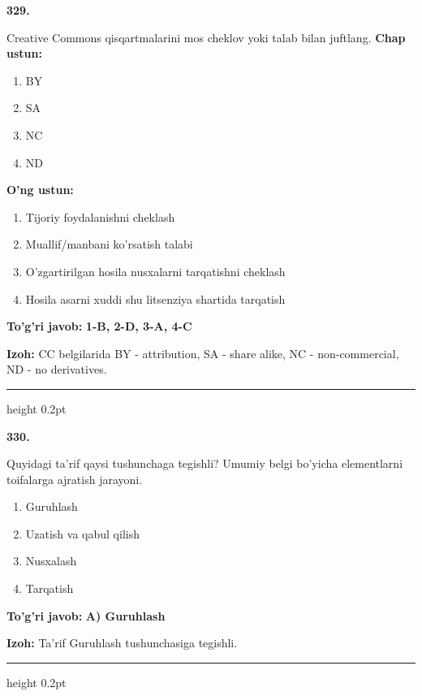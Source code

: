 \documentclass[10pt,a4paper,oneside]{article}
\begin{document}
\noindent\textbf{\color{ink}329.}
\par
Creative Commons qisqartmalarini mos cheklov yoki talab bilan juftlang.
\textbf{\footnotesize Chap ustun:}
\begin{enumerate}[label=\arabic*),leftmargin=9mm]
\item BY
\item SA
\item NC
\item ND
\end{enumerate}
\textbf{\footnotesize O'ng ustun:}
\begin{enumerate}[label=\Alph*),leftmargin=9mm]
\item Tijoriy foydalanishni cheklash
\item Muallif/manbani ko'rsatish talabi
\item O'zgartirilgan hosila nusxalarni tarqatishni cheklash
\item Hosila asarni xuddi shu litsenziya shartida tarqatish
\end{enumerate}
\begin{tcolorbox}[enhanced,breakable,colback=teal!4,colframe=teal!50!black,boxrule=0.5pt,arc=1.1mm,left=3mm,right=3mm,top=1.7mm,bottom=1.7mm,before skip=2mm,after skip=2mm]
\textbf{\color{teal}To'g'ri javob:} \textbf{1-B, 2-D, 3-A, 4-C}
\par\smallskip
\textbf{Izoh:} CC belgilarida BY - attribution, SA - share alike, NC - non-commercial, ND - no derivatives.
\end{tcolorbox}
\vspace{2mm}\hrule height 0.2pt \vspace{3mm}

\noindent\textbf{\color{ink}330.}
\par
Quyidagi ta'rif qaysi tushunchaga tegishli? Umumiy belgi bo'yicha elementlarni toifalarga ajratish jarayoni.
\begin{enumerate}[label=\Alph*),leftmargin=9mm]
\item Guruhlash
\item Uzatish va qabul qilish
\item Nusxalash
\item Tarqatish
\end{enumerate}
\begin{tcolorbox}[enhanced,breakable,colback=teal!4,colframe=teal!50!black,boxrule=0.5pt,arc=1.1mm,left=3mm,right=3mm,top=1.7mm,bottom=1.7mm,before skip=2mm,after skip=2mm]
\textbf{\color{teal}To'g'ri javob:} \textbf{A) Guruhlash}
\par\smallskip
\textbf{Izoh:} Ta'rif Guruhlash tushunchasiga tegishli.
\end{tcolorbox}
\vspace{2mm}\hrule height 0.2pt \vspace{3mm}
\end{document}
